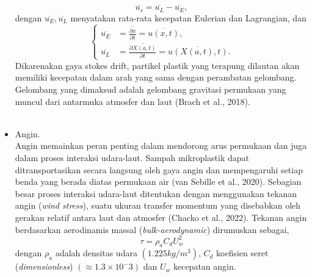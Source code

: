 \documentclass{beamer}
\begin{document}
\begin{frame}[allowframebreaks]
\begin{itemize}
		\begin{equation}
			\overline{u_s}=\overline{u_L}-\overline{u_E},
		\end{equation}
		dengan $\overline{u_E},\overline{u_L}$ menyatakan rata-rata kecepatan Eulerian dan Lagrangian, dan
		\begin{equation*}
			\begin{cases}
				\overline{u_E} &= \overline{\frac{\partial x}{\partial t}} = \overline{u(x,t)}, \\
				\overline{u_L} &= \overline{\frac{\partial X(a,t)}{\partial t}} = \overline{u(X(a,t),t)}.
			\end{cases}	
		\end{equation*} 
		Dikarenakan gaya stokes drift, partikel plastik yang terapung dilautan akan memiliki kecepatan dalam arah yang sama dengan perambatan gelombang. Gelombang yang dimaksud adalah gelombang gravitasi permukaan yang muncul dari antarmuka atmosfer dan laut (Brach et al., 2018).
		\\ \vspace{-5.5pt} $\;$ \normalsize
		\item Angin. \\
		\tiny Angin memainkan peran penting dalam mendorong arus permukaan dan juga dalam proses interaksi udara-laut. Sampah mikroplastik dapat ditransportasikan secara langsung oleh gaya angin dan mempengaruhi setiap benda yang berada diatas permukaan air (van Sebille et al., 2020). Sebagian besar proses interaksi udara-laut ditentukan dengan menggunakan tekanan angin (\textit{wind stress}), suatu ukuran transfer momentum yang disebabkan oleh gerakan relatif antara laut dan atmosfer (Chacko et al., 2022). Tekanan angin berdasarkan aerodinamis massal (\textit{bulk-aerodynamic}) dirumuskan sebagai,
		\begin{equation}
			\tau = \rho_a C_d U_w^2
		\end{equation}
		dengan $\rho_a$ adalah densitas udara $(1.225 kg/m^3)$, $C_d$ koefisien seret (\textit{dimensionless}) $(\approx 1.3 \times 10^-3)$ dan $U_w$ kecepatan angin.
	\end{itemize}
\end{frame}
\end{document}
